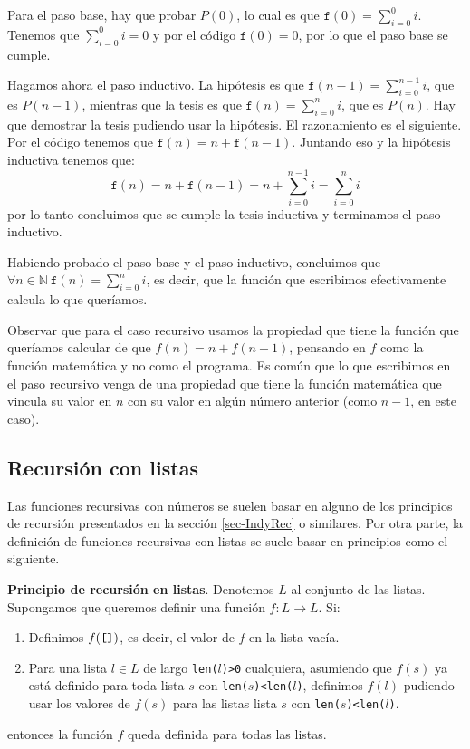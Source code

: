 \documentclass[a4paper, 12pt]{report}
\newcommand{\N}{\mathbb{N}}
\newcommand{\te}{\text}
\theoremstyle{definition}
\begin{document}
Para el paso base, hay que probar $P(0)$, lo cual es que $\mathtt{f}(0)=\sum_{i=0}^0i$. Tenemos que $\sum_{i=0}^0i=0$ y por el código $\mathtt{f}(0)=0$, por lo que el paso base se cumple.

Hagamos ahora el paso inductivo. La hipótesis es que $\mathtt{f}(n-1)=\sum_{i=0}^{n-1}i$, que es $P(n-1)$, mientras que la tesis es que $\mathtt{f}(n)=\sum_{i=0}^{n}i$, que es $P(n)$. Hay que demostrar la tesis pudiendo usar la hipótesis. El razonamiento es el siguiente. Por el código tenemos que $\mathtt{f}(n) = n + \mathtt{f}(n-1)$. Juntando eso y la hipótesis inductiva tenemos que:
$$\mathtt{f}(n) = n + \mathtt{f}(n-1) = n + \sum_{i=0}^{n-1}i=\sum_{i=0}^{n}i
$$
por lo tanto concluimos que se cumple la tesis inductiva y terminamos el paso inductivo.

Habiendo probado el paso base y el paso inductivo, concluimos que $\forall n\in\N ~\mathtt{f}(n)=\sum_{i=0}^ni$, es decir, que la función que escribimos efectivamente calcula lo que queríamos.

Observar que para el caso recursivo usamos la propiedad que tiene la función que queríamos calcular de que $f(n)=n+f(n-1)$, pensando en $f$ como la función matemática y no como el programa. Es común que lo que escribimos en el paso recursivo venga de una propiedad que tiene la función matemática que vincula su valor en $n$ con su valor en algún número anterior (como $n-1$, en este caso).

\subsection{Recursión con listas}

Las funciones recursivas con números se suelen basar en alguno de los principios de recursión presentados en la sección \ref{sec-IndyRec} o similares. Por otra parte, la definición de funciones recursivas con listas se suele basar en principios como el siguiente.

{\bf Principio de recursión en listas}. Denotemos $L$ al conjunto de las listas. Supongamos que queremos definir una función $f:L\to L$. Si:
\begin{enumerate}
	\item Definimos $f(\te{\tt []})$, es decir, el valor de $f$ en la lista vacía.
	\item Para una lista $l\in L$ de largo {\tt len($l$)>0} cualquiera, asumiendo que $f(s)$ ya está definido para toda lista $s$ con {\tt len($s$)<len($l$)}, definimos $f(l)$ pudiendo usar los valores de $f(s)$ para las listas lista $s$ con {\tt len($s$)<len($l$)}.
\end{enumerate}
entonces la función $f$ queda definida para todas las listas.
\end{document}

